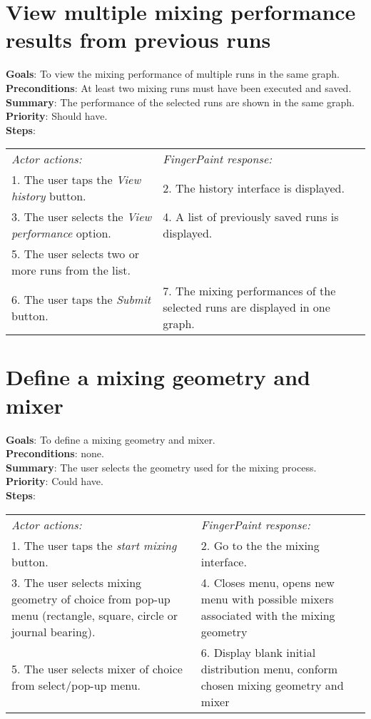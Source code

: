 \begin{appendices}
    \section{View multiple mixing performance results from previous runs}
  \textbf{Goals}: To view the mixing performance of multiple runs in the same graph.\\
  \textbf{Preconditions}: At least two mixing runs must have been executed and saved.\\
  \textbf{Summary}: The performance of the selected runs are shown in the same graph.\\
  \textbf{Priority}: Should have.\\
  \textbf{Steps}: \\
  \begin{tabular}{ p{} p{} }
  	\emph{Actor actions:} & \emph{FingerPaint response:} \\
	   1. The user taps the \emph{View history} button. & 2. The history interface is displayed. \\
	 3. The user selects the \emph{View performance} option. & 4. A list of previously saved runs is displayed.\\
	 5. The user selects two or more runs from the list. & \\
	 6. The user taps the \emph{Submit} button. & 7. The mixing performances of the selected runs are displayed in one graph.\\
  \end{tabular}


\section{Define a mixing geometry and mixer}
  \textbf{Goals}: To define a mixing geometry and mixer.\\
  \textbf{Preconditions}: none.\\
  \textbf{Summary}: The user selects the geometry used for the mixing process.\\
  \textbf{Priority}: Could have.\\
  \textbf{Steps}: \\
  \begin{tabular}{ p{} p{} }
  	\emph{Actor actions:} & \emph{FingerPaint response:} \\
	1. The user taps the \emph{start mixing} button. & 2. Go to the the mixing interface. \\
	3. The user selects mixing geometry of choice from pop-up menu (rectangle, square, circle or journal bearing). & 4. Closes menu, opens new menu with possible mixers associated with the mixing geometry\\
	5. The user selects mixer of choice from select/pop-up menu. & 6.	Display blank initial distribution menu, conform chosen mixing geometry and mixer\\
  \end{tabular}
  

\end{appendices}
